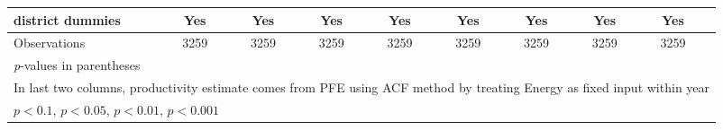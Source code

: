 \begin{table}[htbp]
\begin{tabular}{l*{8}{cc}}
district dummies    &         Yes         &            &         Yes         &            &         Yes         &            &         Yes         &            &         Yes         &            &         Yes         &            &         Yes         &            &         Yes         &            \\
\midrule
Observations        &        3259         &            &        3259         &            &        3259         &            &        3259         &            &        3259         &            &        3259         &            &        3259         &            &        3259         &            \\
\bottomrule
\multicolumn{17}{l}{\footnotesize \textit{p}-values in parentheses}\\
\multicolumn{17}{l}{\footnotesize In last two columns, productivity estimate comes from PFE using ACF method by treating Energy as fixed input within year}\\
\multicolumn{17}{l}{\footnotesize \sym{+} \(p<0.1\), \sym{*} \(p<0.05\), \sym{**} \(p<0.01\), \sym{***} \(p<0.001\)}\\
\end{tabular}
\end{table}
